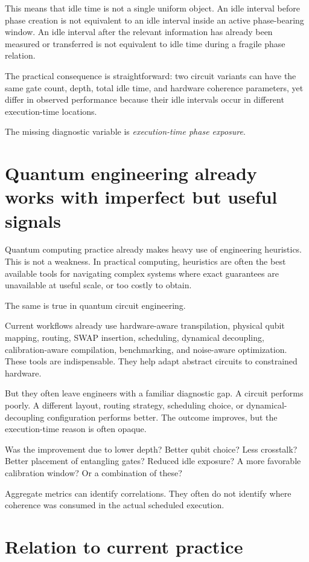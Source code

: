 \documentclass[11pt]{article}
\begin{document}
This means that idle time is not a single uniform object. An idle interval before phase creation is not equivalent to an idle interval inside an active phase-bearing window. An idle interval after the relevant information has already been measured or transferred is not equivalent to idle time during a fragile phase relation.

The practical consequence is straightforward: two circuit variants can have the same gate count, depth, total idle time, and hardware coherence parameters, yet differ in observed performance because their idle intervals occur in different execution-time locations.

The missing diagnostic variable is \emph{execution-time phase exposure}.

\section*{Quantum engineering already works with imperfect but useful signals}

Quantum computing practice already makes heavy use of engineering heuristics. This is not a weakness. In practical computing, heuristics are often the best available tools for navigating complex systems where exact guarantees are unavailable at useful scale, or too costly to obtain.

The same is true in quantum circuit engineering.

Current workflows already use hardware-aware transpilation, physical qubit mapping, routing, SWAP insertion, scheduling, dynamical decoupling, calibration-aware compilation, benchmarking, and noise-aware optimization. These tools are indispensable. They help adapt abstract circuits to constrained hardware.

But they often leave engineers with a familiar diagnostic gap. A circuit performs poorly. A different layout, routing strategy, scheduling choice, or dynamical-decoupling configuration performs better. The outcome improves, but the execution-time reason is often opaque.

Was the improvement due to lower depth? Better qubit choice? Less crosstalk? Better placement of entangling gates? Reduced idle exposure? A more favorable calibration window? Or a combination of these?

Aggregate metrics can identify correlations. They often do not identify where coherence was consumed in the actual scheduled execution.

\section*{Relation to current practice}
\end{document}
